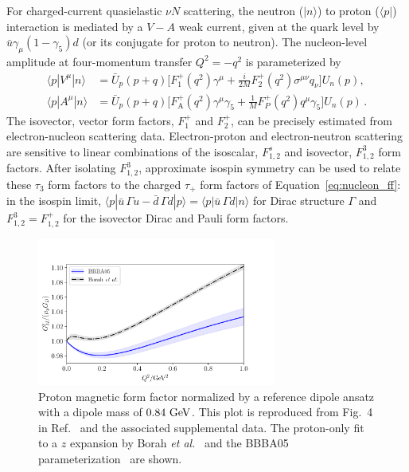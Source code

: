 \documentclass{ar-1col}
\begin{document}
For charged-current quasielastic $\nu N$ scattering,
the neutron ($|n\rangle$) to proton ($\langle p|$)
interaction is mediated by a $V-A$ weak current,
 given at the quark level by $\bar{u}\gamma_\mu(1- \gamma_5)d$
 (or its conjugate for proton to neutron).
 The nucleon-level amplitude at four-momentum transfer $Q^2 = -q^2$ is parameterized by
\begin{align}\label{eq:nucleon_ff}
\langle p | V^\mu | n \rangle
    &= \bar{U}_p(p+q) \Big[
        F_1^+(q^2) \gamma^\mu
        +\frac{i}{2M} F_2^+(q^2) \sigma^{\mu\nu} q_\nu
    \Big] U_n(p),
\nonumber\\
\langle p | A^\mu | n \rangle
    &= \bar{U}_p(p+q) \Big[
        F_{\mathrm{A}}^+(q^2) \gamma^\mu \gamma_5
        +\frac{1}{M} F_P^+(q^2) q^\mu \gamma_5
    \Big] U_n(p)\, .
\end{align}
The isovector, vector form factors, $F_1^+$ and $F_2^+$, can be precisely estimated from electron-nucleon scattering data.
Electron-proton and electron-neutron scattering are sensitive to linear combinations of the isoscalar, $F_{1,2}^s$ and isovector, $F_{1,2}^3$ form factors.  After isolating $F_{1,2}^3$, approximate isospin symmetry can be used to relate these $\tau_3$ form factors to the charged $\tau_+$ form factors of Equation~\eqref{eq:nucleon_ff}: in the isospin limit, $\langle p| \bar{u}\, \Gamma u - \bar{d}\, \Gamma d |p\rangle = \langle p| \bar{u}\, \Gamma d |n\rangle$
 for Dirac structure $\Gamma$ and $F_{1,2}^3 = F_{1,2}^+$
 for the isovector Dirac and Pauli form factors.
\begin{figure}
 \centering
 \includegraphics[width=0.7\textwidth]{plots/proton_magnetic-standalone.pdf}
 \vspace{4pt}
\caption{
Proton magnetic form factor normalized by a reference dipole ansatz
with a dipole mass of $0.84~{\rm GeV}$.
This plot is reproduced from Fig.~4 in Ref.~\cite{Borah:2020gte}
 and the associated supplemental data.
The proton-only fit to a $z$ expansion by Borah {\it et al.}~\cite{Borah:2020gte}
and the BBBA05 parameterization~\cite{Bradford:2006yz} are shown.
\label{fig:protonmagneticff}
}
\end{figure}
\end{document}
